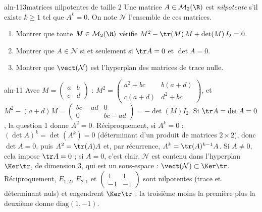 \begin{exo}{aln-11}{3}{matrices nilpotentes de taille $2$}
Une matrice $A\in\mathcal M_2(\R)$ est \emph{nilpotente} s'il existe $k\geq1$ tel que $A^k=0$. On note $\mathcal N$ l'ensemble de ces matrices.
\begin{enumerate}
\item Montrer que toute $M\in\mathcal M_2(\R)$ vérifie $M^2-\tr(M)\,M+\det(M)\,I_2=0$.
\item Montrer que $A\in\mathcal N$ si et seulement si $\tr A=0$ et $\det A=0$.
\item Montrer que $\vect(\mathcal N)$ est l'hyperplan des matrices de trace nulle.
\end{enumerate}
\end{exo}
\begin{corrige}{aln-11}
 Avec $M=\begin{pmatrix}a&b\\c&d\end{pmatrix}$ : $M^2=\begin{pmatrix}a^2+bc&b(a+d)\\c(a+d)&d^2+bc\end{pmatrix}$, et
$M^2-(a+d)M=\begin{pmatrix}bc-ad&0\\0&bc-ad\end{pmatrix}=-\det(M)I_2$.
 Si $\tr A=\det A=0$, la question 1 donne $A^2=0$. Réciproquement, si $A^k=0$ : $(\det A)^k=\det(A^k)=0$ (déterminant d'un
produit de matrices $2\times2$), donc $\det A=0$, puis $A^2=\tr(A)A$ et, par récurrence, $A^k=\tr(A)^{k-1}A$. Si $A\neq0$, cela impose
$\tr A=0$ ; si $A=0$, c'est clair.
 $\mathcal N$ est contenu dans l'hyperplan $\Ker\tr$, de dimension $3$, qui est un sous-espace : $\vect(\mathcal N)\subset\Ker\tr$.
Réciproquement, $E_{1,2}$, $E_{2,1}$ et $\begin{pmatrix}1&1\\-1&-1\end{pmatrix}$ sont nilpotentes (trace et déterminant nuls) et
engendrent $\Ker\tr$ : la troisième moins la première plus la deuxième donne $\mathrm{diag}(1,-1)$.
\end{corrige}

